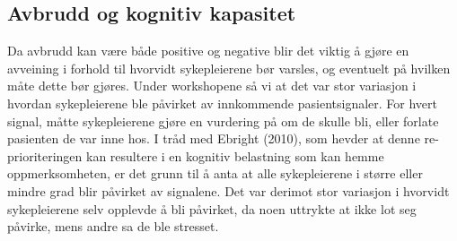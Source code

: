 \subsection{Avbrudd og kognitiv kapasitet}
Da avbrudd kan være både positive og negative blir det viktig å gjøre en avveining i forhold til hvorvidt sykepleierene bør varsles, og eventuelt på hvilken måte dette bør gjøres. Under workshopene så vi at det var stor variasjon i hvordan sykepleierene ble påvirket av innkommende pasientsignaler. For hvert signal, måtte sykepleierene gjøre en vurdering på om de skulle bli, eller forlate pasienten de var inne hos. I tråd med Ebright (2010), som hevder at denne re-prioriteringen kan resultere i en kognitiv belastning som kan hemme oppmerksomheten, er det grunn til å anta at alle sykepleierene i større eller mindre grad blir påvirket av signalene. Det var derimot stor variasjon i hvorvidt sykepleierene selv opplevde å bli påvirket, da noen uttrykte at ikke lot seg påvirke, mens andre sa de ble stresset.

